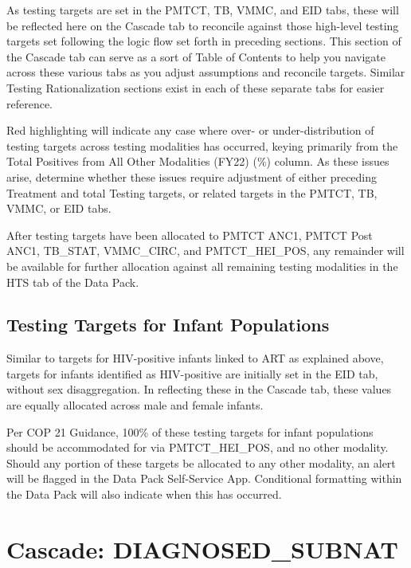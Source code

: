 \documentclass[
  openany]{book}
\begin{document}
As testing targets are set in the PMTCT, TB, VMMC, and EID tabs, these
will be reflected here on the Cascade tab to reconcile against those
high-level testing targets set following the logic flow set forth in
preceding sections. This section of the Cascade tab can serve as a sort
of Table of Contents to help you navigate across these various tabs as
you adjust assumptions and reconcile targets. Similar Testing
Rationalization sections exist in each of these separate tabs for easier
reference.

Red highlighting will indicate any case where over- or
under-distribution of testing targets across testing modalities has
occurred, keying primarily from the Total Positives from All Other
Modalities (FY22) (\%) column. As these issues arise, determine whether
these issues require adjustment of either preceding Treatment and total
Testing targets, or related targets in the PMTCT, TB, VMMC, or EID tabs.

After testing targets have been allocated to PMTCT ANC1, PMTCT Post
ANC1, TB\_STAT, VMMC\_CIRC, and PMTCT\_HEI\_POS, any remainder will be
available for further allocation against all remaining testing
modalities in the HTS tab of the Data Pack.

\hypertarget{testing-targets-for-infant-populations}{%
\subsection{Testing Targets for Infant Populations}\label{testing-targets-for-infant-populations}}

Similar to targets for HIV-positive infants linked to ART as explained
above, targets for infants identified as HIV-positive are initially set
in the EID tab, without sex disaggregation. In reflecting these in the
Cascade tab, these values are equally allocated across male and female
infants.

Per COP 21 Guidance, 100\% of these testing targets for infant
populations should be accommodated for via PMTCT\_HEI\_POS, and no other
modality. Should any portion of these targets be allocated to any other
modality, an alert will be flagged in the Data Pack Self-Service App.
Conditional formatting within the Data Pack will also indicate when this
has occurred.

\hypertarget{cascade-diagnosed_subnat}{%
\section{Cascade: DIAGNOSED\_SUBNAT}\label{cascade-diagnosed_subnat}}
\end{document}
